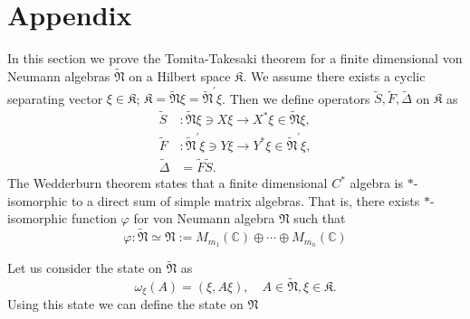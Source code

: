 \section{Appendix}
In this section we prove the Tomita-Takesaki theorem for a finite dimensional
von Neumann algebras $\tilde{\mathfrak{N}}$ on a Hilbert space $\mathfrak{K}$.
We assume there exists a cyclic separating vector $\xi\in \mathfrak{K}$;
$\mathfrak{K}=\tilde{\mathfrak{N}}\xi=\tilde{\mathfrak{N}}^\prime\xi$.
Then we define operators $\tilde{S},\tilde{F},\tilde{\Delta}$ on $\mathfrak{K}$ as
$$
\begin{split}
\tilde{S}&:\tilde{\mathfrak{N}}\xi\ni X\xi \to X^\ast \xi \in \tilde{\mathfrak{N}}\xi,\\
\tilde{F}&:\tilde{\mathfrak{N}}^\prime\xi\ni Y\xi \to Y^\ast \xi \in \tilde{\mathfrak{N}}^\prime\xi,\\
\tilde{\Delta}&=\tilde{F}\tilde{S}.
\end{split}
$$
The Wedderburn theorem states that a finite dimensional $C^{\ast}$ algebra is  $\ast$-isomorphic to a direct sum of simple matrix algebras. That is, there exists $\ast$-isomorphic function $\varphi$ for von Neumann algebra $\mathfrak{N}$ such that
$$
\varphi:\tilde{\mathfrak{N}}\simeq \mathfrak{N}:=M_{m_1}(\mathbb{C})\oplus \cdots \oplus M_{m_n}(\mathbb{C})
$$

Let us consider the state on $\tilde{\mathfrak{N}}$ as
$$
\omega_\xi(A)=(\xi,A\xi),\quad A\in \tilde{\mathfrak{N}},\xi\in \mathfrak{K}.
$$
Using this state we can define the state on $\mathfrak{N}$
$$

